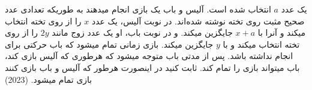 یک عدد $a$ انتخاب شده است. آلیس و باب یک بازی انجام میدهند به طوریکه تعدادی عدد صحیح مثبت روی تخته نوشته شده‌اند. در نوبت آلیس، یک عدد $x$ را از روی تخته انتخاب میکند و آنرا با $x + a$ جایگزین میکند. و در نوبت باب، او یک عدد زوج مانند $2y$ را از روی تخته انتخاب میکند و با $y$ جایگزین میکند. 
بازی زمانی تمام میشود که باب حرکتی برای انجام نداشته باشد. 
پس از مدتی باب متوجه میشود که هرطوری که آلیس بازی کند، باب میتواند بازی را تمام کند. ثابت کنید در اینصورت هرطور که آلیس و باب بازی کنند بازی تمام میشود.
(2023)